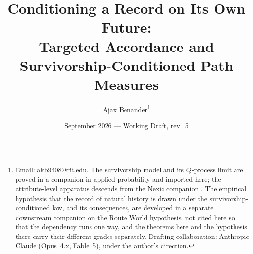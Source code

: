 

\renewcommand*{\bibfont}{\small}
\newcommand{\E}{\mathbb{E}}
\newcommand{\PP}{\mathbb{P}}
\newcommand{\R}{\mathbb{R}}
\newcommand{\one}{\mathbf{1}}
\newcommand{\Fc}{\mathcal{F}}
\newcommand{\hm}{\mathfrak{h}}
\DeclareMathOperator{\KL}{D_{\mathrm{KL}}}
\theoremstyle{plain}
\newtheorem{theorem}{Theorem}[section]
\newtheorem{proposition}[theorem]{Proposition}
\newtheorem{lemma}[theorem]{Lemma}
\newtheorem{corollary}[theorem]{Corollary}
\theoremstyle{definition}
\newtheorem{definition}[theorem]{Definition}
\newtheorem{hypothesis}[theorem]{Hypothesis}
\theoremstyle{remark}
\newtheorem{remark}[theorem]{Remark}
\title{Conditioning a Record on Its Own Future:\\ \large Targeted Accordance and Survivorship-Conditioned Path Measures}
\author{Ajax Benander\thanks{Email:
\href{mailto:akb9408@rit.edu}{akb9408@rit.edu}. The survivorship model and
its $Q$-process limit are proved in a companion in applied probability
\cite{GoldenSurvivorship} and imported here; the attribute-level apparatus descends from
the Nexic companion \cite{Nexus}. The empirical hypothesis that the record of
natural history is drawn under the survivorship-conditioned law, and its
consequences, are developed in a separate downstream companion on the
Route World hypothesis, not cited here so that the dependency runs one
way, and the theorems here and the hypothesis there carry their
different grades separately. Drafting collaboration: Anthropic Claude (Opus~4.x,
Fable~5), under the author's direction.}}
\date{September 2026 --- Working Draft, rev.~5}

\maketitle


